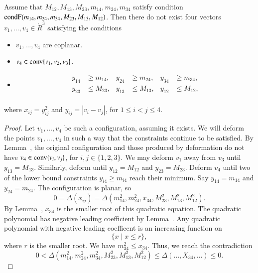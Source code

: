 \begin{tarskidata}
\begin{tarski}
\begin{lemma} 
Assume that $M_{12},M_{13},M_{23},m_{14},m_{24},m_{34}$ satisfy
condition ${\operatorname{condF}}(m_{14},m_{24},m_{34},M_{23},M_{13},M_{12})$.
Then there do not exist four vectors
$v_1,\ldots,v_4\in\ring{R}^3$ satisfying the conditions
	\begin{itemize}
		\item $v_1,\ldots,v_4$ are coplanar.
		\item $v_4\in{\operatorname{conv}}\{v_1,v_2,v_3\}$.
		\item $$
	\begin{array}{rlrlrl}
		y_{14} &\ge m_{14}, &y_{24} &\ge m_{24}, &y_{34}&\ge m_{34},\\
		y_{23} &\le  M_{23}, &y_{13} & \le M_{13}, &y_{12}&\le M_{12},\\
	\end{array}
	$$
	\end{itemize}
where
$x_{ij}=y_{ij}^2$ and $y_{ij}=|v_i-v_j|$,
for $1\le i < j \le 4$.  
\end{lemma}



\begin{proof}
	Let $v_1,\ldots,v_4$ be such a configuration, assuming it exists.  
We will deform the points $v_1,\ldots,v_4$ in such a way that the constraints continue
to be satisfied.  By Lemma~,
the original configuration and those produced by deformation do not have
	$v_4\in{\operatorname{conv}}\{v_i,v_j\}$, for $i,j\in\{1,2,3\}$.
We may deform $v_1$ away from $v_3$ until $y_{13}=M_{13}$.  Similarly,
deform until $y_{12}=M_{12}$ and $y_{23}=M_{23}$.    Deform $v_4$ until two of the
lower bound constraints $y_{i4}\ge m_{i4}$ reach their minimum. 
Say $y_{14}=m_{14}$ and $y_{24}=m_{24}$.
The configuration is planar, so
	$$
	0=\Delta(x_{ij}) = \Delta(m_{14}^2,m_{24}^2,x_{34},M_{23}^2,M_{13}^2,M_{12}^2).
	$$
By Lemma~, $x_{34}$ is the smaller root of this quadratic equation.
The quadratic polynomial has negative leading coefficient by Lemma~.
Any quadratic polynomial with negative leading coefficent is an increasing function on
	$$\{x \mid x \le r\},$$ where $r$ is the smaller root.
We have $m_{34}^2\le x_{34}$. Thus, we reach the contradiction
	$$0<\Delta(m_{14}^2,m_{24}^2,m_{34}^2,M_{23}^2,M_{13}^2,M_{12}^2)
        \le \Delta(\ldots,X_{34},\ldots)\le 0.$$
\end{proof}
\end{tarski}








\end{tarskidata}
